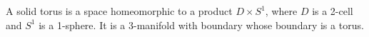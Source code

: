A solid torus is a space homeomorphic to a product $D \times S^1$, where $D$ is a 2-cell and $S^1$ is a 1-sphere. It is a 3-manifold with boundary whose boundary is a torus.
